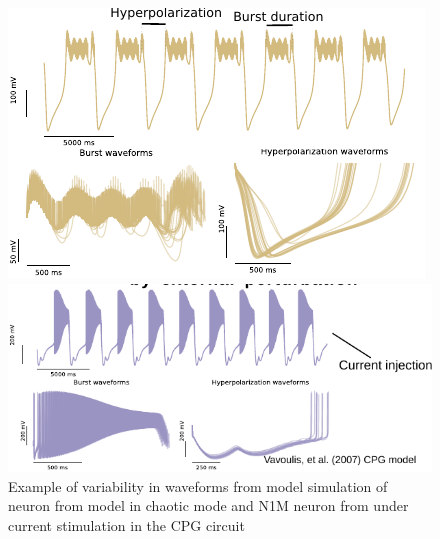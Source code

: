 \begin{figure}[hbt]
	\centering
	\begin{minipage}{0.45\textwidth}
		\includegraphics[width=\textwidth]{img/invariants/variability/TN-burst_variability.pdf}
	\end{minipage}
	\begin{minipage}{0.45\textwidth}
		\includegraphics[width=\textwidth]{img/invariants/variability/n1m_vav_burst_variability.pdf}
	\end{minipage}
	\caption{Example of variability in waveforms from model simulation of neuron from \cite{nowotny_probing_2008} model in chaotic mode and N1M neuron from \cite{vavoulis_dynamic_2007} under current stimulation in the CPG circuit}
	\label{fig:model burst variability}
\end{figure}



